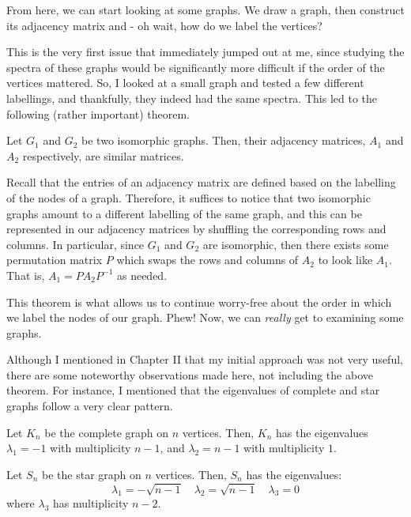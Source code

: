 \documentclass{article}
\begin{document}
From here, we can start looking at some graphs.
We draw a graph, then construct its adjacency matrix and - oh wait, how do we label the vertices?

This is the very first issue that immediately jumped out at me, since studying the spectra of these graphs would be significantly more difficult if the order of the vertices mattered.
So, I looked at a small graph and tested a few different labellings, and thankfully, they indeed had the same spectra.
This led to the following (rather important) theorem.

\begin{thm}
Let $ G_{1} $ and $ G_{2} $ be two isomorphic graphs.
Then, their adjacency matrices, $ A_{1} $ and $ A_{2} $ respectively, are similar matrices.
\end{thm}

\begin{pf}
Recall that the entries of an adjacency matrix are defined based on the labelling of the nodes of a graph.
Therefore, it suffices to notice that two isomorphic graphs amount to a different labelling of the same graph,
and this can be represented in our adjacency matrices by shuffling the corresponding rows and columns. \vsp
In particular, since $ G_{1} $ and $ G_{2} $ are isomorphic, then there exists some permutation matrix $ P $ which swaps the rows and columns of $ A_{2} $ to look like $ A_{1} $.
That is, $ A_{1} = PA_{2}P^{-1} $ as needed.
\end{pf}

This theorem is what allows us to continue worry-free about the order in which we label the nodes of our graph. Phew!
Now, we can \textit{really} get to examining some graphs. \npgh

Although I mentioned in Chapter II that my initial approach was not very useful, there are some noteworthy observations made here, not including the above theorem.
For instance, I mentioned that the eigenvalues of complete and star graphs follow a very clear pattern.

\newpage
\begin{lm}
Let $ K_{n} $ be the complete graph on $ n $ vertices.
Then, $ K_{n} $ has the eigenvalues $ \lambda_{1} = -1 $ with multiplicity $ n-1 $, and $ \lambda_{2} = n-1 $ with multiplicity $ 1 $.
\end{lm}

\begin{lm}
Let $ S_{n} $ be the star graph on $ n $ vertices.
Then, $ S_{n} $ has the eigenvalues:
\begin{equation*}
\lambda_{1} = -\sqrt{n-1} \quad \lambda_{2} = \sqrt{n-1} \quad \lambda_{3} = 0
\end{equation*}
where $ \lambda_{3} $ has multiplicity $ n-2 $.
\end{lm}
\end{document}
